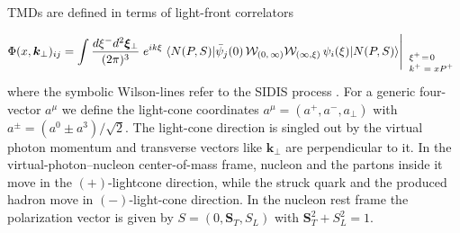 \documentclass[a4paper,11pt]{article}
\newcommand{\be}{\begin{equation}}
\newcommand{\ee}{\end{equation}}
\newcommand{\la}{\langle}
\newcommand{\ra}{\rangle}
\newcommand{\with}[3]{{\Biggl|{\renewcommand*{\arraystretch}{0.8}
	\begin{array}{l} 
	\phantom{X}\\
	\mbox{\scriptsize ${#1}$}\\
	\mbox{\scriptsize ${#2}$}\\
	\mbox{\scriptsize #3}\end{array}}}}
\def\bfkperp{{\bm k}_\perp}
\begin{document}
TMDs are defined in terms of light-front correlators
\be\label{Eq:correlator}
    	\Phi(x,\bfkperp)_{ij} = \int\frac{ d \xi^- d^2{\bm \xi}_\perp}{(2\pi)^3}
	\;e^{ik\xi}\;\la N(P,S)|\bar\psi_j(0)\,{\cal W}_{(0,\,\infty)}
	{\cal W}_{(\infty,\xi)}\,\psi_i(\xi)|N(P,S)\ra
    	\with{ }{\xi^+\!=\!0}{$k^+ = xP^+$}
	\ee
where the symbolic Wilson-lines refer to the SIDIS process 
\cite{Collins:2002kn}. For a generic four-vector $a^\mu$ we define
the light-cone coordinates $a^\mu=(a^+,a^-,a_\perp)$ with 
$a^\pm=(a^0\pm a^3)/\sqrt{2}$. 
The light-cone direction is singled out by the virtual photon momentum 
and transverse vectors like $\bfkperp$ are perpendicular to it. In the
virtual-photon--nucleon center-of-mass frame, nucleon and the partons 
inside it move in the $(+)$-lightcone direction, while the struck 
quark and the produced hadron move in $(-)$-light-cone direction.
In the nucleon rest frame the polarization vector is given by 
$S=(0,{\bm S}_T,S_L)$ with ${\bm S}_T^2+S_L^2=1$.


\newpage
\end{document}
